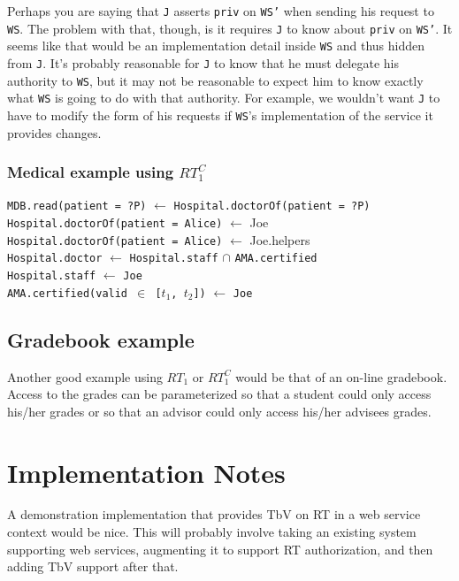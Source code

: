 \documentclass{article}
\begin{document}
Perhaps you are saying that \texttt{J} asserts \texttt{priv} on \texttt{WS'} when sending his
request to \texttt{WS}. The problem with that, though, is it requires \texttt{J} to know about
\texttt{priv} on \texttt{WS'}. It seems like that would be an implementation detail inside
\texttt{WS} and thus hidden from \texttt{J}. It's probably reasonable for \texttt{J} to know
that he must delegate his authority to \texttt{WS}, but it may not be reasonable to expect him
to know exactly what \texttt{WS} is going to do with that authority. For example, we wouldn't
want \texttt{J} to have to modify the form of his requests if \texttt{WS}'s implementation of
the service it provides changes.

\subsubsection{Medical example using $RT_1^C$}

\texttt{MDB.read(patient = ?P)} $\leftarrow$ \texttt{Hospital.doctorOf(patient = ?P)} \\
\texttt{Hospital.doctorOf(patient = Alice)} $\leftarrow$ Joe \\
\texttt{Hospital.doctorOf(patient = Alice)} $\leftarrow$ Joe.helpers \\
\texttt{Hospital.doctor} $\leftarrow$ \texttt{Hospital.staff} $\cap$ \texttt{AMA.certified} \\
\texttt{Hospital.staff} $\leftarrow$ \texttt{Joe} \\
\texttt{AMA.certified(valid $\in$ [$t_1$, $t_2$])} $\leftarrow$ \texttt{Joe}

\subsection{Gradebook example}

Another good example using $RT_1$ or $RT_1^C$ would be that of an on-line gradebook. Access to
the grades can be parameterized so that a student could only access his/her grades or so that an
advisor could only access his/her advisees grades.

\section{Implementation Notes}

A demonstration implementation that provides TbV on RT in a web service context would be nice.
This will probably involve taking an existing system supporting web services, augmenting it to
support RT authorization, and then adding TbV support after that.
\end{document}
